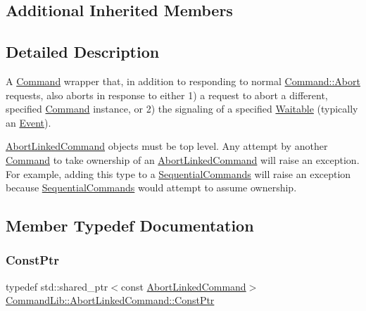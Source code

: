 \subsection*{Additional Inherited Members}


\subsection{Detailed Description}
A \mbox{\hyperlink{class_command_lib_1_1_command}{Command}} wrapper that, in addition to responding to normal \mbox{\hyperlink{class_command_lib_1_1_command_a247cbc7325e3b9d9d7044d449b989aa6}{Command\+::\+Abort}} requests, also aborts in response to either 1) a request to abort a different, specified \mbox{\hyperlink{class_command_lib_1_1_command}{Command}} instance, or 2) the signaling of a specified \mbox{\hyperlink{class_command_lib_1_1_waitable}{Waitable}} (typically an \mbox{\hyperlink{class_command_lib_1_1_event}{Event}}). 

\mbox{\hyperlink{class_command_lib_1_1_abort_linked_command}{Abort\+Linked\+Command}} objects must be top level. Any attempt by another \mbox{\hyperlink{class_command_lib_1_1_command}{Command}} to take ownership of an \mbox{\hyperlink{class_command_lib_1_1_abort_linked_command}{Abort\+Linked\+Command}} will raise an exception. For example, adding this type to a \mbox{\hyperlink{class_command_lib_1_1_sequential_commands}{Sequential\+Commands}} will raise an exception because \mbox{\hyperlink{class_command_lib_1_1_sequential_commands}{Sequential\+Commands}} would attempt to assume ownership. 

\subsection{Member Typedef Documentation}
\mbox{\label{class_command_lib_1_1_abort_linked_command_a45ac62243ddc4bff695a1abba7363dd8}} 
\subsubsection{\texorpdfstring{Const\+Ptr}{ConstPtr}}
{\footnotesize\ttfamily typedef std\+::shared\+\_\+ptr$<$const \mbox{\hyperlink{class_command_lib_1_1_abort_linked_command}{Abort\+Linked\+Command}}$>$ \mbox{\hyperlink{class_command_lib_1_1_abort_linked_command_a45ac62243ddc4bff695a1abba7363dd8}{Command\+Lib\+::\+Abort\+Linked\+Command\+::\+Const\+Ptr}}}




